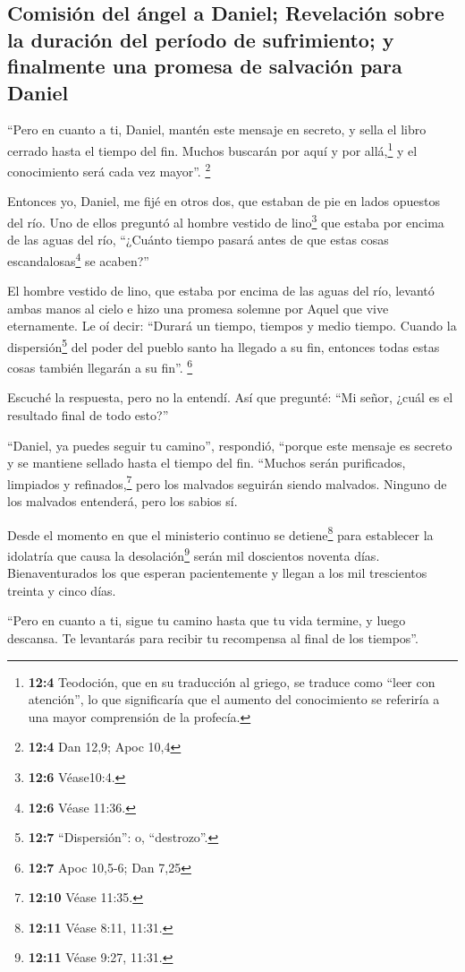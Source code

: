 \hypertarget{comisiuxf3n-del-uxe1ngel-a-daniel-revelaciuxf3n-sobre-la-duraciuxf3n-del-peruxedodo-de-sufrimiento-y-finalmente-una-promesa-de-salvaciuxf3n-para-daniel}{%
\subsection{Comisión del ángel a Daniel; Revelación sobre la duración
del período de sufrimiento; y finalmente una promesa de salvación para
Daniel}\label{comisiuxf3n-del-uxe1ngel-a-daniel-revelaciuxf3n-sobre-la-duraciuxf3n-del-peruxedodo-de-sufrimiento-y-finalmente-una-promesa-de-salvaciuxf3n-para-daniel}}

 ``Pero en cuanto a ti, Daniel, mantén este mensaje en
secreto, y sella el libro cerrado hasta el tiempo del fin. Muchos
buscarán por aquí y por allá,\footnote{\textbf{12:4} Teodoción, que en
  su traducción al griego, se traduce como ``leer con atención'', lo que
  significaría que el aumento del conocimiento se referiría a una mayor
  comprensión de la profecía.} y el conocimiento será cada vez mayor''.
\footnote{\textbf{12:4} Dan 12,9; Apoc 10,4}

 Entonces yo, Daniel, me fijé en otros dos, que estaban de
pie en lados opuestos del río.  Uno de ellos preguntó al
hombre vestido de lino\footnote{\textbf{12:6} Véase10:4.} que estaba por
encima de las aguas del río, ``¿Cuánto tiempo pasará antes de que estas
cosas escandalosas\footnote{\textbf{12:6} Véase 11:36.} se acaben?''

 El hombre vestido de lino, que estaba por encima de las
aguas del río, levantó ambas manos al cielo e hizo una promesa solemne
por Aquel que vive eternamente. Le oí decir: ``Durará un tiempo, tiempos
y medio tiempo. Cuando la dispersión\footnote{\textbf{12:7}
  ``Dispersión'': o, ``destrozo''.} del poder del pueblo santo ha
llegado a su fin, entonces todas estas cosas también llegarán a su
fin''. \footnote{\textbf{12:7} Apoc 10,5-6; Dan 7,25}

 Escuché la respuesta, pero no la entendí. Así que
pregunté: ``Mi señor, ¿cuál es el resultado final de todo esto?''

 ``Daniel, ya puedes seguir tu camino'', respondió,
``porque este mensaje es secreto y se mantiene sellado hasta el tiempo
del fin.  ``Muchos serán purificados, limpiados y
refinados,\footnote{\textbf{12:10} Véase 11:35.} pero los malvados
seguirán siendo malvados. Ninguno de los malvados entenderá, pero los
sabios sí.

 Desde el momento en que el ministerio continuo se
detiene\footnote{\textbf{12:11} Véase 8:11, 11:31.} para establecer la
idolatría que causa la desolación\footnote{\textbf{12:11} Véase 9:27,
  11:31.} serán mil doscientos noventa días. 
Bienaventurados los que esperan pacientemente y llegan a los mil
trescientos treinta y cinco días.

 ``Pero en cuanto a ti, sigue tu camino hasta que tu vida
termine, y luego descansa. Te levantarás para recibir tu recompensa al
final de los tiempos''.
